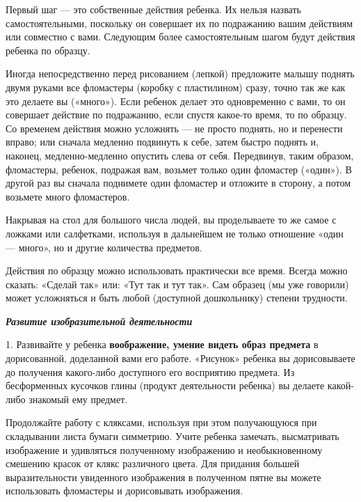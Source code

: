 \documentclass{book}
\renewcommand{\emph}[1]{\textit{#1}}
\begin{document}
Первый шаг --- это собственные действия ребенка. Их нельзя назвать
самостоятельными, поскольку он совершает их по подражанию вашим
действиям или совместно с вами. Следующим более самостоятельным шагом
будут действия ребенка по образцу.

Иногда непосредственно перед рисованием (лепкой) предложите малышу
поднять двумя руками все фломастеры (коробку с пластилином) сразу, точно
так же как это делаете вы («много»). Если ребенок делает это
одновременно с вами, то он совершает действие по подражанию, если спустя
какое-то время, то по образцу. Со временем действия можно усложнять ---
не просто поднять, но и перенести вправо; или сначала медленно подвинуть
к себе, затем быстро поднять и, наконец, медленно-медленно опустить
слева от себя. Передвинув, таким образом, фломастеры, ребенок, подражая
вам, возьмет только один фломастер («один»). В другой раз вы сначала
поднимете один фломастер и отложите в сторону, а потом возьмете много
фломастеров.

Накрывая на стол для большого числа людей, вы проделываете то же самое с
ложками или салфетками, используя в дальнейшем не только отношение «один
--- много», но и другие количества предметов.

Действия по образцу можно использовать практически все время. Всегда
можно сказать: «Сделай так» или: «Тут так и тут так». Сам образец (мы
уже говорили) может усложняться и быть любой (доступной дошкольнику)
степени трудности.

\emph{\textbf{Развитие изобразительной деятельности}}

1. Развивайте у ребенка \textbf{воображение, умение видеть образ
предмета} в дорисованной, доделанной вами его работе. «Рисунок» ребенка
вы дорисовываете до получения какого-либо доступного его восприятию
предмета. Из бесформенных кусочков глины (продукт деятельности ребенка)
вы делаете какой-либо знакомый ему предмет.

Продолжайте работу с кляксами, используя при этом получающуюся при
складывании листа бумаги симметрию. Учите ребенка замечать, высматривать
изображение и удивляться полученному изображению и необыкновенному
смешению красок от клякс различного цвета. Для придания большей
выразительности увиденного изображения в полученном пятне вы можете
использовать фломастеры и дорисовывать изображения.
\end{document}
